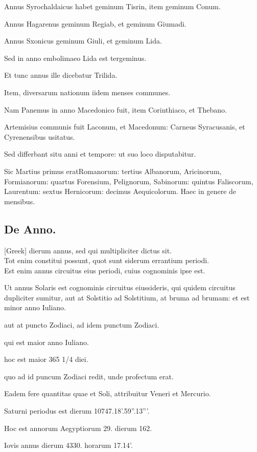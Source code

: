 Annus Syrochaldaicus habet geminum Tisrin, item geminum Conum.

Annus Hagarenus geminum Regiab, et geminum Giumadi.

Annus Sxonicus geminum Giuli, et geminum Lida.

Sed in
anno embolimaeo Lida est tergeminus.

Et tunc annus ille dicebatur
Trilida.

Item, diversarum nationum iidem menses communes.

Nam
Panemus in anno Macedonico fuit, item Corinthiaco, et Thebano.

Artemisius communis fuit Laconum, et Macedonum: Carneus Syracusanis,
et Cyrenensibus usitatus.

Sed differbant situ anni et tempore:
ut suo loco disputabitur.

Sic Martius primus eratRomanorum:
tertius Albanorum, Aricinorum, Formianorum: quartus Forensium,
Pelignorum, Sabinorum: quintus Faliscorum, Laurentum:
sextus Hernicorum: decimus Aequicolorum. Haec in genere
de mensibus.


\subsection{De Anno.}
\setcounter{parcount}{0}

 \textgreek{[Greek]}
 dierum annus, sed qui multipliciter dictus
sit. \\ \p
Tot enim constitui possunt, quot sunt siderum errantium
periodi.\\ \p
Est enim annus circuitus eius periodi, cuius cognominis
ipse est.

Ut annus Solaris est cognominis circuitus eiussideris,
qui quidem circuitus dupliciter sumitur, aut at Solstitio ad Solstitium,
at bruma ad brumam: et est minor anno Iuliano.

aut at puncto Zodiaci,
ad idem punctum Zodiaci.

qui est maior anno Iuliano.

hoc est maior 365 1/4 diei.

quo ad id puncum Zodiaci redit, unde profectum
erat.

Eadem fere quantitas quae et Soli, attribuitur Veneri et Mercurio.

Saturni periodus est dierum 10747.18'.59''.13'''.

Hoc est annorum
Aegyptiorum 29. dierum 162.

Iovis annus dierum 4330. horarum 17.14'.

